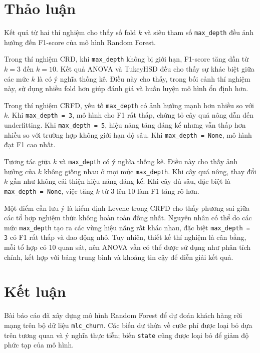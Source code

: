 \documentclass[12pt,a4paper]{article}
\begin{document}
\section{Thảo luận}

Kết quả từ hai thí nghiệm cho thấy số fold $k$ và siêu tham số \texttt{max\_depth} đều ảnh hưởng đến F1-score của mô hình Random Forest.

Trong thí nghiệm CRD, khi \texttt{max\_depth} không bị giới hạn, F1-score tăng dần từ $k=3$ đến $k=10$. Kết quả ANOVA và TukeyHSD đều cho thấy sự khác biệt giữa các mức $k$ là có ý nghĩa thống kê. Điều này cho thấy, trong bối cảnh thí nghiệm này, sử dụng nhiều fold hơn giúp đánh giá và huấn luyện mô hình ổn định hơn.

Trong thí nghiệm CRFD, yếu tố \texttt{max\_depth} có ảnh hưởng mạnh hơn nhiều so với $k$. Khi \texttt{max\_depth = 3}, mô hình cho F1 rất thấp, chứng tỏ cây quá nông dẫn đến underfitting. Khi \texttt{max\_depth = 5}, hiệu năng tăng đáng kể nhưng vẫn thấp hơn nhiều so với trường hợp không giới hạn độ sâu. Khi \texttt{max\_depth = None}, mô hình đạt F1 cao nhất.

Tương tác giữa $k$ và \texttt{max\_depth} có ý nghĩa thống kê. Điều này cho thấy ảnh hưởng của $k$ không giống nhau ở mọi mức \texttt{max\_depth}. Khi cây quá nông, thay đổi $k$ gần như không cải thiện hiệu năng đáng kể. Khi cây đủ sâu, đặc biệt là \texttt{max\_depth = None}, việc tăng $k$ từ 3 lên 10 làm F1 tăng rõ hơn.

Một điểm cần lưu ý là kiểm định Levene trong CRFD cho thấy phương sai giữa các tổ hợp nghiệm thức không hoàn toàn đồng nhất. Nguyên nhân có thể do các mức \texttt{max\_depth} tạo ra các vùng hiệu năng rất khác nhau, đặc biệt \texttt{max\_depth = 3} có F1 rất thấp và dao động nhỏ. Tuy nhiên, thiết kế thí nghiệm là cân bằng, mỗi tổ hợp có 10 quan sát, nên ANOVA vẫn có thể được sử dụng như phân tích chính, kết hợp với bảng trung bình và khoảng tin cậy để diễn giải kết quả.

\section{Kết luận}

Bài báo cáo đã xây dựng mô hình Random Forest để dự đoán khách hàng rời mạng trên bộ dữ liệu \texttt{mlc\_churn}. Các biến dư thừa về cước phí được loại bỏ dựa trên tương quan và ý nghĩa thực tiễn; biến \texttt{state} cũng được loại bỏ để giảm độ phức tạp của mô hình.
\end{document}
